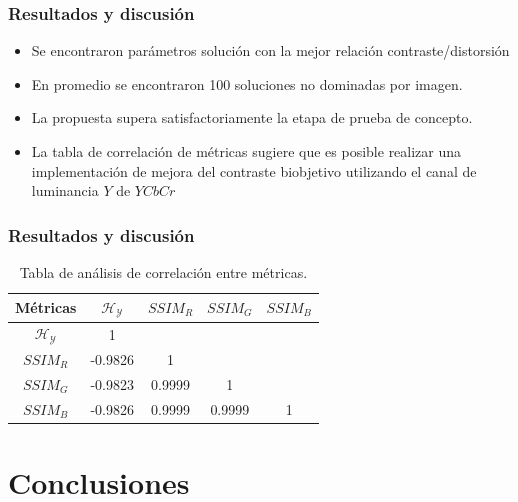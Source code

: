 \documentclass[usenames,dvipsnames]{beamer}
\begin{document}
    \begin{frame}
    \frametitle{Resultados y discusión} 
\begin{exampleblock}{}

\begin{itemize}
	\item Se encontraron parámetros solución con la mejor relación contraste/distorsión
	\item En promedio se encontraron 100 soluciones no dominadas por imagen.
	\item La propuesta supera satisfactoriamente la etapa de prueba de concepto.
	\item La tabla de correlación de métricas sugiere que es posible realizar una implementación de mejora del contraste biobjetivo utilizando el canal de luminancia $Y$ de $YCbCr$
\end{itemize}

\end{exampleblock}

\end{frame}

\begin{frame}
\frametitle{Resultados y discusión} 
\begin{table}[H]
\setlength{\abovecaptionskip}{2pt plus 3pt minus 2pt} %
\caption[Parámetros de entrada para $MOPSO$]{Tabla de análisis de correlación entre métricas.}
\begin{center}
\begin{tabular}{||c | c c c c||} 
\hline
Métricas & $\mathscr{H_Y}$ & $SSIM_R$ & $SSIM_G$ & $SSIM_B$ \\ 
\hline
$\mathscr{H_Y}$ & 1 &   &   &  \\ 
\hline
$SSIM_R$ & -0.9826  & 1 &  &  \\ 
\hline
$SSIM_G$ & -0.9823 & 0.9999   & 1   &  \\ 
\hline
$SSIM_B$ & -0.9826 & 0.9999   & 0.9999   & 1 \\ 
\hline
\end{tabular}
\end{center}
\label{table:correlacion}
\end{table}

\end{frame}


\section{Conclusiones}
\end{document}
